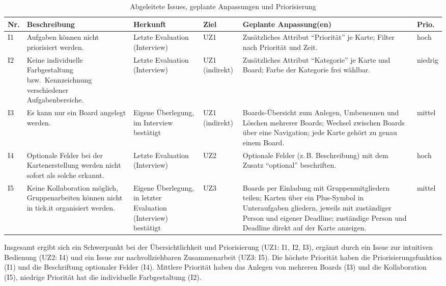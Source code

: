 \begin{table}[htbp]
\centering
\caption{Abgeleitete Issues, geplante Anpassungen und Priorisierung}
\label{tab:issues}
\renewcommand{\arraystretch}{1.2}
\begin{tabularx}{\textwidth}{@{}
    l
    >{\raggedright\arraybackslash}p{}
    >{\raggedright\arraybackslash}p{}
    >{\raggedright\arraybackslash}p{}
    >{\raggedright\arraybackslash}X
    l
@{}}
\toprule
\textbf{Nr.} & \textbf{Beschreibung} & \textbf{Herkunft} & \textbf{Ziel} & \textbf{Geplante Anpassung(en)} & \textbf{Prio.} \\
\midrule
I1 & Aufgaben können nicht priorisiert werden.
& Letzte Evaluation (Interview)
& UZ1
& Zusätzliches Attribut \enquote{Priorität} je Karte; Filter nach Priorität und Zeit.
& hoch \\
\midrule
I2 & Keine individuelle Farbgestaltung bzw.\ Kennzeichnung verschiedener Aufgabenbereiche.
& Letzte Evaluation (Interview)
& UZ1 (indirekt)
& Zusätzliches Attribut \enquote{Kategorie} je Karte und Board; Farbe der Kategorie frei wählbar.
& niedrig \\
\midrule
I3 & Es kann nur ein Board angelegt werden.
& Eigene Überlegung, im Interview bestätigt
& UZ1 (indirekt)
& Boards-Übersicht zum Anlegen, Umbenennen und Löschen mehrerer Boards; Wechsel zwischen Boards über eine Navigation; jede Karte gehört zu genau einem Board.
& mittel \\
\midrule
I4 & Optionale Felder bei der Kartenerstellung werden nicht sofort als solche erkannt.
& Letzte Evaluation (Interview)
& UZ2
& Optionale Felder (z.\,B. Beschreibung) mit dem Zusatz \enquote{optional} beschriften.
& hoch \\
\midrule
I5 & Keine Kollaboration möglich, Gruppenarbeiten können nicht in tick.it organisiert werden.
& Eigene Überlegung, in letzter Evaluation (Interview) bestätigt
& UZ3
& Boards per Einladung mit Gruppenmitgliedern teilen; Karten über ein Plus-Symbol in Unteraufgaben gliedern, jeweils mit zuständiger Person und eigener Deadline; zuständige Person und Deadline direkt auf der Karte anzeigen.
& mittel \\
\bottomrule
\end{tabularx}
\end{table}

Insgesamt ergibt sich ein Schwerpunkt bei der Übersichtlichkeit und Priorisierung (UZ1: I1, I2, I3), ergänzt durch ein Issue zur intuitiven Bedienung (UZ2: I4) und ein Issue zur nachvollziehbaren Zusammenarbeit (UZ3: I5).
Die höchste Priorität haben die Priorisierungsfunktion (I1) und die Beschriftung optionaler Felder (I4).
Mittlere Priorität haben das Anlegen von mehreren Boards (I3) und die Kollaboration (I5), niedrige Priorität hat die individuelle Farbgestaltung (I2).

